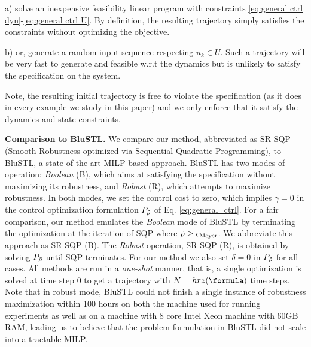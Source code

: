  a) solve an inexpensive feasibility linear program with constraints \eqref{eq:general ctrl dyn}-\eqref{eq:general ctrl U}. By definition, the resulting trajectory simply satisfies the constraints without optimizing the objective.
 
 b) or, generate a random input sequence respecting $u_k \in U$. 
 Such a trajectory will be very fast to generate and feasible w.r.t the dynamics but is unlikely to satisfy the specification on the system. 

Note, the resulting initial trajectory is free to violate the specification (as it does in every example we study in this paper) and we only enforce that it satisfy the dynamics and state constraints.


\textbf{Comparison to BluSTL.}
We compare our method, abbreviated as SR-SQP (Smooth Robustness optimized via Sequential Quadratic Programming), to BluSTL, a state of the art MILP based approach. BluSTL has two modes of operation:  \textit{Boolean} (B), which aims at satisfying the specification without maximizing its robustness, and \textit{Robust} (R), which attempts to maximize robustness. 
In both modes, we set the control cost to zero, which implies $\gamma=0$ in the control optimization formulation $P_{\tilde{\rho}}$ of Eq. \ref{eq:general_ctrl}. For a fair comparison, our method emulates the \textit{Boolean} mode of BluSTL by terminating the optimization at the iteration of SQP where $\tilde{\rho} \geq \epsilon_{\text{Meyer}}$. We abbreviate this approach as SR-SQP (B).
The \textit{Robust} operation, SR-SQP (R), is obtained by solving $P_{\tilde{\rho}}$ until SQP terminates. For our method we also set $\delta=0$ in $P_{\tilde{\rho}}$ for all cases.
All methods are run in a \textit{one-shot} manner, that is, a single optimization is solved at time step $0$ to get a trajectory with $N = hrz(\formula)$ time steps. Note that in robust mode, BluSTL could not finish a single instance of robustness maximization within 100 hours on both the machine used for running experiments as well as on a machine with 8 core Intel Xeon machine with 60GB RAM, leading us to believe that the problem formulation in BluSTL did not scale into a tractable MILP. 


